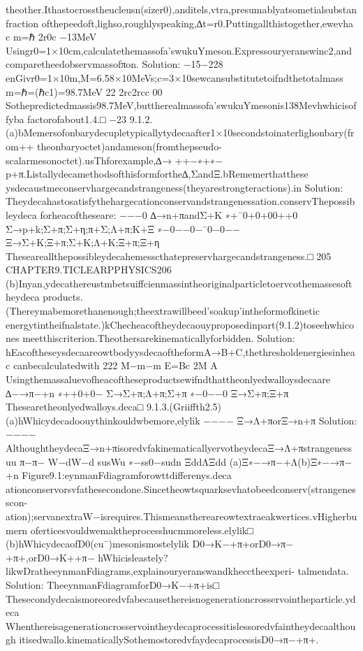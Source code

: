 {{{{{{{{{{{theother.Ithastocrosstheucleusn(sizer0),anditels,vtra,presumablyatsometialsubstanfraction
ofthepeedoft,lighso,roughlyspeaking,∆t=r0.Puttingallthistogether,ewevha
c
m=ℏ
2r0c
−13MeV
Usingr0=1×10cm,calculatethemassofa’swukuYmeson.Expressouryeranswinc2,and
comparetheedobservmassofπon.
Solution:
−15−228
enGivr0=1×10m,M=6.58×10MeVs;c=3×10sewcansubstitutetoifndthetotalmass
m=ℏ=(ℏc1)=98.7MeV
22
2rc2rcc
00
Sothepredictedmassis98.7MeV,buttherealmassofa’swukuYmesonis138Mevhwhicisoffyba
factorofabout1.4.□
−23
9.1.2.(a)bMemersofonbarydecupletypicallytydecaafter1×10secondstoinaterlighonbary(from++
theonbaryoctet)andameson(fromthepseudo-scalarmesonoctet).usThforexample,∆→
++−∗+∗−
p+π.Listallydecamethodsofthisformforthe∆,ΣandΞ.bRememerthatthese
ysdecaustmeconservhargecandstrangeness(theyarestrongteractions).in
Solution:
Theydecahastosatisfythehargecationconservandstrangenessation.conservThepossibleydeca
forheacoftheseare:
−−−0
∆→n+πandΣ+K
∗+¯0+0+00++0
Σ→p+k;Σ+π;Σ+η;π+Σ;Λ+π;K+Ξ
∗−0−−0−¯0−0−−
Ξ→Σ+K;Ξ+π;Σ+K;Λ+K;Ξ+π;Ξ+η
Theseareallthepossibleydecahemesscthatepreservhargecandstrangeness.□
205
CHAPTER9.TICLEARPPHYSICS206
(b)Inyan,ydecathereustmbetsuiffcienmassintheoriginalparticletoervcothemassesoftheydeca
products.(Thereymabemorethanenough;theextrawillbeed’soakup’intheformofkinetic
energytintheifnalstate.)kChecheacoftheydecaouyproposedinpart(9.1.2)toseehwhicones
meetthiscriterion.Theothersarekinematicallyforbidden.
Solution:
hEacoftheseysdecaareowtbodyysdecaoftheformA→B+C,thethresholdenergiesinheac
canbecalculatedwith
222
M−m−m
E=Bc
2M
A
Usingthemassaluevofheacoftheseproductsewifndthattheonlyedwalloysdecaare
∆−→π−+n
∗++0+0−
Σ→Σ+π;Λ+π;Σ+π
∗−0−−0
Ξ→Σ+π;Ξ+π
Thesearetheonlyedwalloys.deca□
9.1.3.(Griiffth2.5)
(a)hWhicydecadoouythinkouldwbemore,elylik
−−−−
Ξ→Λ+πorΞ→n+π
Solution:
−−−−
AlthoughtheydecaΞ→n+πisoredvfakinematicallyervotheydecaΞ→Λ+πstrangeness
uu
π−π−
W−dW−d
susWu
∗−ss0−sudn
ΞddΛΞdd
(a)Ξ∗−→π−+Λ(b)Ξ∗−→π−+n
Figure9.1:eynmanFdiagramforowttdifferenys.deca
ationconservorsvfathesecondone.Sincetheowtsquarksevhatobeedconserv(strangenesscon-
ation);servanextraW−isrequires.Thismeansthereareowtextraeakwertices.vHigherbumern
oferticesvouldwemaktheprocesshucmmoreless.elylik□
(b)hWhicydecaofD0(cu¯)mesonismostelylik
D0→K−+π+orD0→π−+π+,orD0→K++π−
hWhicisleastely?likwDratheeynmanFdiagrams,explainouryeranswandkhecctheexperi-
talmendata.
Solution:
TheeynmanFdiagramforD0→K−+π+is□
Thesecondydecaismoreoredvfabecausethereisnogenerationcrosservointheparticle.ydeca
Whenthereisagenerationcrosservointheydecaprocessitislessoredvfaintheydecaalthough
itisedwallo.kinematicallySothemostoredvfaydecaprocessisD0→π−+π+.
}}}}}}}}}}}
